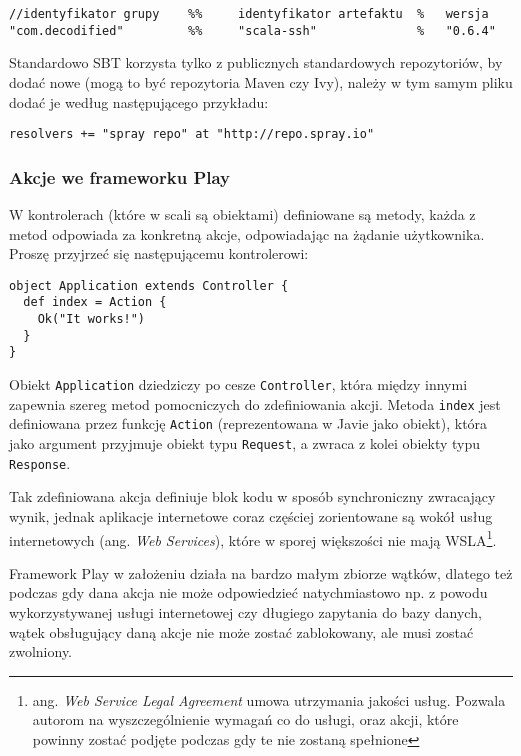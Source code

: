 \begin{lstlisting}
//identyfikator grupy    %%     identyfikator artefaktu  %   wersja
"com.decodified"         %%     "scala-ssh"              %   "0.6.4"
\end{lstlisting}

Standardowo SBT korzysta tylko z publicznych standardowych repozytoriów, by dodać nowe (mogą to być repozytoria Maven czy Ivy), należy w tym samym pliku dodać je według następującego przykładu:

\begin{lstlisting}
resolvers += "spray repo" at "http://repo.spray.io"
\end{lstlisting}

\subsubsection{Akcje we frameworku Play}

W kontrolerach (które w scali są obiektami) definiowane są metody, każda z metod odpowiada za konkretną akcje, odpowiadając na żądanie użytkownika. Proszę przyjrzeć się następującemu kontrolerowi:

\begin{lstlisting}
object Application extends Controller {
  def index = Action {
    Ok("It works!")
  }
}
\end{lstlisting}

Obiekt \lstinline{Application} dziedziczy po cesze \lstinline{Controller}, która między innymi zapewnia szereg metod pomocniczych do zdefiniowania akcji. Metoda \lstinline{index} jest definiowana przez funkcję \lstinline{Action} (reprezentowana w Javie jako obiekt), która jako argument przyjmuje obiekt typu \lstinline{Request}, a zwraca z kolei obiekty typu \lstinline{Response}. 

\par

Tak zdefiniowana akcja definiuje blok kodu w sposób synchroniczny zwracający wynik, jednak aplikacje internetowe coraz częściej zorientowane są wokół usług internetowych (ang. \emph{Web Services}), które w sporej większości nie mają WSLA\footnote{ang. \emph{Web Service Legal Agreement} umowa utrzymania jakości usług. Pozwala autorom na wyszczególnienie wymagań co do usługi, oraz akcji, które powinny zostać podjęte podczas gdy te nie zostaną spełnione}.

\par

Framework Play w założeniu działa na bardzo małym zbiorze wątków, dlatego też podczas gdy dana akcja nie może odpowiedzieć natychmiastowo np. z powodu wykorzystywanej usługi internetowej czy długiego zapytania do bazy danych, wątek obsługujący daną akcje nie może zostać zablokowany, ale musi zostać zwolniony.

